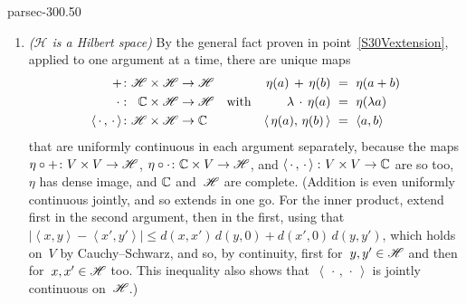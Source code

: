 \documentclass[b5page]{book}
\begin{document}
\begin{solution}{parsec-300.50}
\begin{enumerate}
\item
\emph{($\mathscr{H}$ is a Hilbert space)}
By the general fact proven in point~\ref{S30Vextension},
applied to one argument at a time,
there are unique maps
\begin{equation}
\label{S30VHops}
\begin{alignedat}{3}
+ &\colon &\mathscr{H}&\times \mathscr{H}\to \mathscr{H}\\
\,\cdot\, &\colon &\mathbb{C}&\times\mathscr{H}\to \mathscr{H}\\
\left<\,\cdot\,,\,\cdot\,\right>&\colon
&\mathscr{H}&\times\mathscr{H}\to \mathbb{C}
\end{alignedat}
\quad\text{with}\quad
\begin{alignedat}{3}
\eta(a)\,+\,\eta(b)\ &=\ \eta(a+b)\\
\lambda\,\cdot\,\eta(a)\ &=\ \eta(\lambda a) \\
\left<\,\eta(a),\,\eta(b)\,\right>\ &=\ \left<a,b\right>
\end{alignedat}
\end{equation}
that are uniformly continuous in each argument separately,
because the maps
$\eta\circ +\colon V\times V\to \mathscr{H}$,
$\eta\circ \cdot \colon \mathbb{C}\times V\to \mathscr{H}$,
and $\left<\,\cdot\,,\,\cdot\,\right>\colon V\times V\to \mathbb{C}$
are so too,
$\eta$ has dense image,
and $\mathbb{C}$ and~$\mathscr{H}$ are complete.
(Addition is even uniformly continuous jointly,
and so extends in one go.
For the inner product,
extend first in the second argument, then in the first,
using that
$|\left<x,y\right>-\left<x',y'\right>|
\leq d(x,x')\,d(y,0)+d(x',0)\,d(y,y')$,
which holds on~$V$ by Cauchy--Schwarz,
and so, by continuity,
first for~$y,y'\in\mathscr{H}$
and then for~$x,x'\in\mathscr{H}$ too.
This inequality also shows that~$\left<\,\cdot\,,\,\cdot\,\right>$
is jointly continuous on~$\mathscr{H}$.)


\end{enumerate}
\end{solution}
\end{document}

